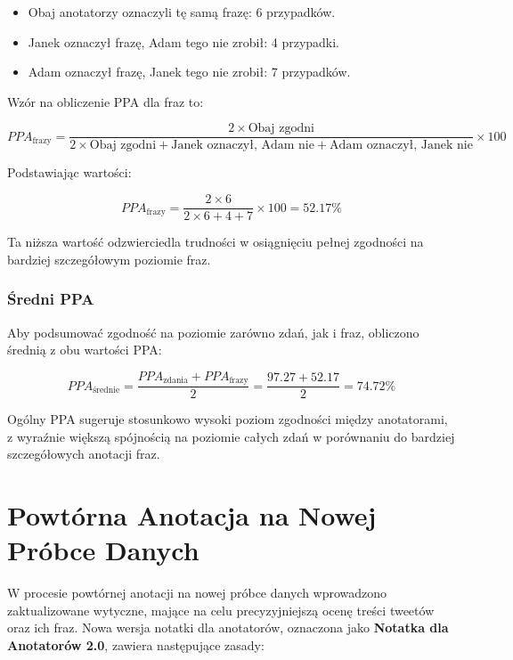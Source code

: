 \documentclass[12pt]{article}
\begin{document}
\begin{itemize}
    \item Obaj anotatorzy oznaczyli tę samą frazę: 6 przypadków.
    \item Janek oznaczył frazę, Adam tego nie zrobił: 4 przypadki.
    \item Adam oznaczył frazę, Janek tego nie zrobił: 7 przypadków.
\end{itemize}

Wzór na obliczenie PPA dla fraz to:

\begin{dmath}
PPA_{\text{frazy}} = \frac{2 \times \text{Obaj zgodni}}{2 \times \text{Obaj zgodni} + \text{Janek oznaczył, Adam nie} + \text{Adam oznaczył, Janek nie}} \times 100
\end{dmath}

Podstawiając wartości:

\begin{dmath}
PPA_{\text{frazy}} = \frac{2 \times 6}{2 \times 6 + 4 + 7} \times 100 = 52.17\%
\end{dmath}

Ta niższa wartość odzwierciedla trudności w osiągnięciu pełnej zgodności na bardziej szczegółowym poziomie fraz.

\subsubsection{Średni PPA}

Aby podsumować zgodność na poziomie zarówno zdań, jak i fraz, obliczono średnią z obu wartości PPA:

\begin{dmath}
PPA_{\text{średnie}} = \frac{PPA_{\text{zdania}} + PPA_{\text{frazy}}}{2} = \frac{97.27 + 52.17}{2} = 74.72\%
\end{dmath}

Ogólny PPA sugeruje stosunkowo wysoki poziom zgodności między anotatorami, z wyraźnie większą spójnością na poziomie całych zdań w porównaniu do bardziej szczegółowych anotacji fraz.

\section{Powtórna Anotacja na Nowej Próbce Danych}

W procesie powtórnej anotacji na nowej próbce danych wprowadzono zaktualizowane wytyczne, mające na celu precyzyjniejszą ocenę treści tweetów oraz ich fraz. Nowa wersja notatki dla anotatorów, oznaczona jako \textbf{Notatka dla Anotatorów 2.0}, zawiera następujące zasady:
\end{document}
